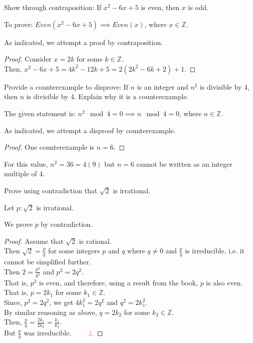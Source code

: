 \documentclass[a4paper]{exam}
\theoremstyle{definition}
\newcommand\Z{\ensuremath{\mathbb{Z}}}
\begin{document}
\begin{questions}
  
\question
  Show through contraposition: If $x^2 - 6x + 5$ is even, then $x$ is odd.
  \begin{solution}
    To prove: $Even(x^2 - 6x + 5) \implies Even(x)$, where $x\in\Z$.

    As indicated, we attempt a proof by contraposition.

    \begin{proof}
      Consider $x=2k$ for some $k\in\Z$.\\
      Then, $x^2 - 6x + 5 = 4k^2 - 12k + 5 = 2(2k^2 - 6k + 2) + 1$.
    \end{proof}
  \end{solution}

\question Provide a counterexample to disprove: If $n$ is an integer and $n^2$ is divisible by 4, then $n$ is divisible by 4. Explain why it is a counterexample.

  \begin{solution}
    The given statement is: $n^2\mod 4 = 0 \implies n\mod 4 = 0$, where $n\in\Z$. 

    As indicated, we attempt a disproof by counterexample.

    \begin{proof}
      One counterexample is $n=6$.
    \end{proof}
        
    For this value, $n^2=36=4(9)$ but $n=6$ cannot be written as an integer multiple of 4.
  \end{solution}
  
\question Prove using contradiction that $\sqrt{2}$ is irrational.

  \begin{solution}
    Let $p: \sqrt{2}$ is irrational.

    We prove $p$ by contradiction.

    \begin{proof}
      Assume that $\sqrt{2}$ is rational.\\
      Then $\sqrt{2} =\frac{p}{q}$ for some integers $p$ and $q$ where $q\neq0$ and $\frac{p}{q}$ is irreducible, i.e. it cannot be simplified further.\\
      Then $2 =\frac{p^2}{q^2}$ and $p^2 =2q^2$.\\
      That is, $p^2$ is even, and therefore, using a result from the book, $p$ is also even.\\
      That is, $p=2k_1$ for some $k_1\in\Z$.\\
      Since, $p^2=2q^2$, we get $4k_1^2 = 2q^2$ and $q^2=2k_1^2$.\\
      By similar reasoning as above, $q=2k_2$ for some $k_2\in\Z$.\\
      Then, $\frac{p}{q} = \frac{2k_1}{2k_2}= \frac{k_1}{k_2}$.\\
      But $\frac{p}{q}$ was irreducible. $\qquad {\color{red}\bot}$
    \end{proof}
  \end{solution}
  

\end{questions}
\end{document}
